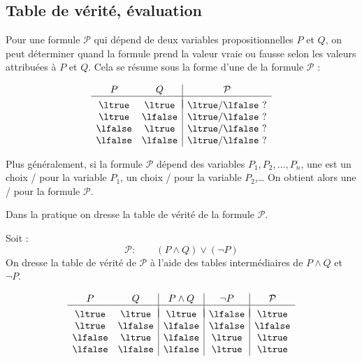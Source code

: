 \documentclass[11pt,class=report,crop=false]{standalone}
\begin{document}
\subsection{Table de vérité, évaluation}

Pour une formule $\mathcal{P}$ qui dépend de deux variables propositionnelles $P$ et $Q$, on peut déterminer quand la formule prend la valeur vraie ou fausse selon les valeurs attribuées à $P$ et $Q$. Cela se résume sous la forme d'une  de la formule $\mathcal{P}$ :

\[
\begin{array}{c c | c}
	P		& Q 		& \mathcal{P} \\
	\hline
	&&	\\[-2ex]
	\ltrue 	& \ltrue 	& \ltrue/\lfalse\ ? \\
	\ltrue 	& \lfalse 	& \ltrue/\lfalse\ ? \\
	\lfalse & \ltrue 	& \ltrue/\lfalse\ ? \\	
	\lfalse & \lfalse 	& \ltrue/\lfalse\ ? \\		
\end{array}
\]

Plus généralement, si la formule $\mathcal{P}$ dépend des variables $P_1, P_2,\ldots,P_n$,
une  est un choix \ltrue/\lfalse{} pour la variable $P_1$, un choix \ltrue/\lfalse{} pour la variable $P_2$,\ldots{}
On obtient alors une  \ltrue/\lfalse{} pour la formule $\mathcal{P}$.

Dans la pratique on dresse la table de vérité de la formule $\mathcal{P}$.

\begin{exemple}
Soit :
\[
\mathcal{P} : \qquad (P \land Q) \lor (\lnot P)
\]
On dresse la table de vérité de $\mathcal{P}$ à l'aide des tables intermédiaires de $P \land Q$ et $\lnot P$.

\[
\begin{array}{c c | c | c | c}
	P		& Q 		& P \land Q 	& \lnot P 	&  \mathcal{P} \\
	\hline
	&&&&	\\[-2ex]
	\ltrue 	& \ltrue 	& \ltrue		& \lfalse 	& \ltrue \\
	\ltrue 	& \lfalse 	& \lfalse		& \lfalse	& \lfalse \\
	\lfalse & \ltrue 	& \lfalse		& \ltrue	& \ltrue \\	
	\lfalse & \lfalse 	& \lfalse 		& \ltrue	& \ltrue \\		
\end{array}
\]

\end{exemple}
\end{document}
